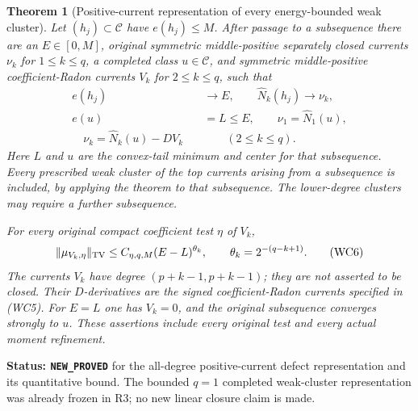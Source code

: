 \documentclass[11pt,a4paper]{article}
\numberwithin{equation}{section}
\newtheorem{theorem}{Theorem}[section]
\theoremstyle{definition}
\theoremstyle{remark}
\begin{document}
\begin{theorem}[Positive-current representation of every energy-bounded weak cluster]
\label{thm:r12-energy-weak-cluster-defect}
Let $(h_j)\subset\mathcal C$ have $e(h_j)\leq M$.  After passage
to a subsequence there are an $E\in[0,M]$, original symmetric
middle-positive separately closed currents $\nu_k$ for $1\leq k\leq q$,
a completed class $u\in\mathcal C$, and symmetric middle-positive
coefficient-Radon currents $V_k$ for $2\leq k\leq q$, such that
\[
 \begin{split}
 e(h_j)&\longrightarrow E,\qquad
           \widehat N_k(h_j)\longrightarrow\nu_k,\\
 e(u)&=L\leq E,\qquad
           \nu_1=\widehat N_1(u),\\
 \boxed{\quad\nu_k=\widehat N_k(u)-DV_k\quad}
                 &\qquad(2\leq k\leq q).
 \end{split}
 \tag{WC5}
\]
Here $L$ and $u$ are the convex-tail minimum and center for that
subsequence.  Every prescribed weak cluster of the top currents
arising from a subsequence is included, by applying the theorem
to that subsequence.  The lower-degree clusters may require a
further subsequence.

For every original compact coefficient test $\eta$ of $V_k$,
\[
       \|\mu_{V_k,\eta}\|_{\rm TV}
             \leq C_{\eta,q,M}(E-L)^{\theta_k},
       \qquad\theta_k=2^{-(q-k+1)}.
 \tag{WC6}
\]
The currents $V_k$ have degree $(p+k-1,p+k-1)$; they are not
asserted to be closed.  Their $D$-derivatives are the signed
coefficient-Radon currents specified in (WC5).  For $E=L$ one
has $V_k=0$, and the original subsequence converges strongly to
$u$.  These assertions include every original test and every
actual moment refinement.
\end{theorem}

\noindent\textbf{Status: \texttt{NEW\_PROVED}} for the all-degree
positive-current defect representation and its quantitative bound.
The bounded $q=1$ completed weak-cluster representation was already
frozen in R3; no new linear closure claim is made.
\end{document}
